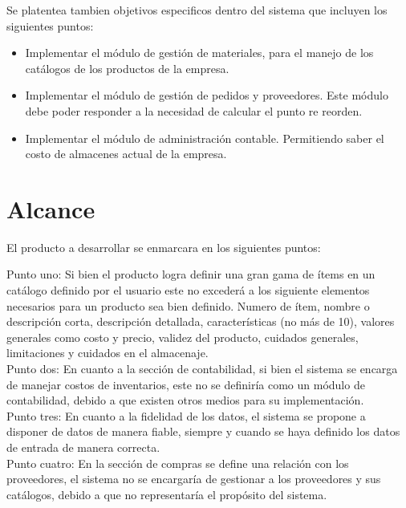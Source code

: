 Se platentea tambien objetivos especificos dentro del sistema que incluyen los siguientes puntos:

\begin{itemize}
\item Implementar el módulo de gestión de materiales, para el manejo de los catálogos de los productos de la empresa.
\item Implementar el módulo de gestión de pedidos y proveedores. Este módulo debe poder responder a la necesidad de calcular el punto re reorden.
\item Implementar el módulo de administración contable. Permitiendo saber el costo de almacenes actual de la empresa.
\end{itemize}


\section{Alcance}

El producto a desarrollar se enmarcara en los siguientes puntos:

Punto uno: Si bien el producto logra definir una gran gama de ítems en un catálogo definido por el usuario este no excederá a los siguiente elementos necesarios para un producto sea bien definido. Numero de ítem, nombre o descripción corta, descripción detallada, características (no más de 10), valores generales como costo y precio, validez del producto, cuidados generales, limitaciones y cuidados en el almacenaje.\\

Punto dos: En cuanto a la sección de contabilidad, si bien el sistema se encarga de manejar costos de inventarios, este no se definiría como un módulo de contabilidad, debido a que existen otros medios para su implementación.\\

Punto tres: En cuanto a la fidelidad de los datos, el sistema se propone a disponer de datos de manera fiable, siempre y cuando se haya definido los datos de entrada de manera correcta.\\

Punto cuatro: En la sección de compras se define una relación con los proveedores, el sistema no se encargaría de gestionar a los proveedores y sus catálogos, debido a que no representaría el propósito del sistema.\\

